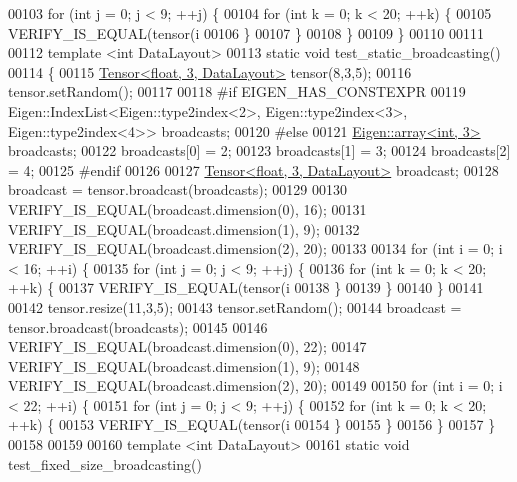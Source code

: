 \begin{DoxyCode}
00103     \textcolor{keywordflow}{for} (\textcolor{keywordtype}{int} j = 0; j < 9; ++j) \{
00104       \textcolor{keywordflow}{for} (\textcolor{keywordtype}{int} k = 0; k < 20; ++k) \{
00105         VERIFY\_IS\_EQUAL(tensor(i%
00106       \}
00107     \}
00108   \}
00109 \}
00110 
00111 
00112 \textcolor{keyword}{template} <\textcolor{keywordtype}{int} DataLayout>
00113 \textcolor{keyword}{static} \textcolor{keywordtype}{void} test\_static\_broadcasting()
00114 \{
00115   \hyperlink{class_eigen_1_1_tensor}{Tensor<float, 3, DataLayout>} tensor(8,3,5);
00116   tensor.setRandom();
00117 
00118 \textcolor{preprocessor}{#if EIGEN\_HAS\_CONSTEXPR}
00119   Eigen::IndexList<Eigen::type2index<2>, Eigen::type2index<3>, Eigen::type2index<4>> broadcasts;
00120 \textcolor{preprocessor}{#else}
00121   \hyperlink{class_eigen_1_1array}{Eigen::array<int, 3>} broadcasts;
00122   broadcasts[0] = 2;
00123   broadcasts[1] = 3;
00124   broadcasts[2] = 4;
00125 \textcolor{preprocessor}{#endif}
00126 
00127   \hyperlink{class_eigen_1_1_tensor}{Tensor<float, 3, DataLayout>} broadcast;
00128   broadcast = tensor.broadcast(broadcasts);
00129 
00130   VERIFY\_IS\_EQUAL(broadcast.dimension(0), 16);
00131   VERIFY\_IS\_EQUAL(broadcast.dimension(1), 9);
00132   VERIFY\_IS\_EQUAL(broadcast.dimension(2), 20);
00133 
00134   \textcolor{keywordflow}{for} (\textcolor{keywordtype}{int} i = 0; i < 16; ++i) \{
00135     \textcolor{keywordflow}{for} (\textcolor{keywordtype}{int} j = 0; j < 9; ++j) \{
00136       \textcolor{keywordflow}{for} (\textcolor{keywordtype}{int} k = 0; k < 20; ++k) \{
00137         VERIFY\_IS\_EQUAL(tensor(i%
00138       \}
00139     \}
00140   \}
00141 
00142   tensor.resize(11,3,5);
00143   tensor.setRandom();
00144   broadcast = tensor.broadcast(broadcasts);
00145 
00146   VERIFY\_IS\_EQUAL(broadcast.dimension(0), 22);
00147   VERIFY\_IS\_EQUAL(broadcast.dimension(1), 9);
00148   VERIFY\_IS\_EQUAL(broadcast.dimension(2), 20);
00149 
00150   \textcolor{keywordflow}{for} (\textcolor{keywordtype}{int} i = 0; i < 22; ++i) \{
00151     \textcolor{keywordflow}{for} (\textcolor{keywordtype}{int} j = 0; j < 9; ++j) \{
00152       \textcolor{keywordflow}{for} (\textcolor{keywordtype}{int} k = 0; k < 20; ++k) \{
00153         VERIFY\_IS\_EQUAL(tensor(i%
00154       \}
00155     \}
00156   \}
00157 \}
00158 
00159 
00160 \textcolor{keyword}{template} <\textcolor{keywordtype}{int} DataLayout>
00161 \textcolor{keyword}{static} \textcolor{keywordtype}{void} test\_fixed\_size\_broadcasting()

\end{DoxyCode}
